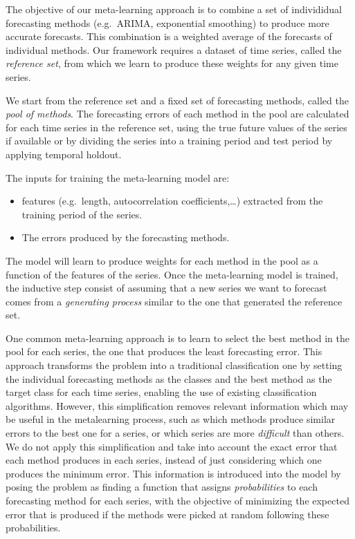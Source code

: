 \documentclass[11pt,a4paper,]{article}
\providecommand{\tightlist}{%
  \setlength{\itemsep}{0pt}\setlength{\parskip}{0pt}}
\theoremstyle{definition}
\theoremstyle{definition}
\theoremstyle{definition}
\theoremstyle{remark}
\begin{document}
The objective of our meta-learning approach is to combine a set of
individidual forecasting methods (e.g.~ARIMA, exponential smoothing) to
produce more accurate forecasts. This combination is a weighted average
of the forecasts of individual methods. Our framework requires a dataset
of time series, called the \emph{reference set}, from which we learn to
produce these weights for any given time series.

We start from the reference set and a fixed set of forecasting methods,
called the \emph{pool of methods}. The forecasting errors of each method
in the pool are calculated for each time series in the reference set,
using the true future values of the series if available or by dividing
the series into a training period and test period by applying temporal
holdout.

The inputs for training the meta-learning model are:

\begin{itemize}
\tightlist
\item
  features (e.g.~length, autocorrelation coefficients,\ldots{})
  extracted from the training period of the series.
\item
  The errors produced by the forecasting methods.
\end{itemize}

The model will learn to produce weights for each method in the pool as a
function of the features of the series. Once the meta-learning model is
trained, the inductive step consist of assuming that a new series we
want to forecast comes from a \emph{generating process} similar to the
one that generated the reference set.

One common meta-learning approach is to learn to select the best method
in the pool for each series, the one that produces the least forecasting
error. This approach transforms the problem into a traditional
classification one by setting the individual forecasting methods as the
classes and the best method as the target class for each time series,
enabling the use of existing classification algorithms. However, this
simplification removes relevant information which may be useful in the
metalearning process, such as which methods produce similar errors to
the best one for a series, or which series are more \emph{difficult}
than others. We do not apply this simplification and take into account
the exact error that each method produces in each series, instead of
just considering which one produces the minimum error. This information
is introduced into the model by posing the problem as finding a function
that assigns \emph{probabilities} to each forecasting method for each
series, with the objective of minimizing the expected error that is
produced if the methods were picked at random following these
probabilities.
\end{document}

